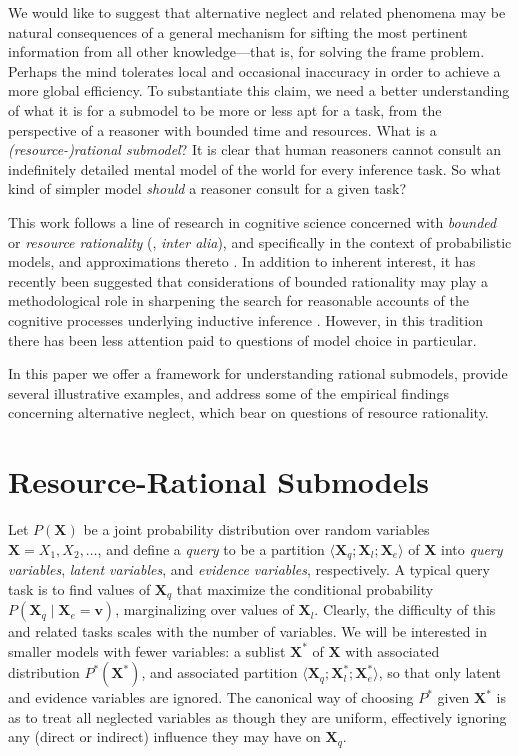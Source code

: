 \documentclass[10pt,letterpaper]{article}
\begin{document}
We would like to suggest that alternative neglect and related phenomena may be natural consequences of a general mechanism for sifting the most pertinent information from all other knowledge---that is, for solving the frame problem. Perhaps the mind tolerates local and occasional inaccuracy in order to achieve a more global efficiency. To substantiate this claim, we need a better understanding of what it is for a submodel to be more or less apt for a task, from the perspective of a reasoner with bounded time and resources. What is a \emph{(resource-)rational submodel}? It is clear that human reasoners cannot consult an indefinitely detailed mental model of the world for every inference task. So what kind of simpler model \emph{should} a reasoner consult for a given task?

This work follows a line of research in cognitive science concerned with \emph{bounded} or \emph{resource rationality} (\citealt{Simon1957,Gigerenzer1996}, \emph{inter alia}), and specifically in the context of probabilistic models, and approximations thereto \citep{Vul2014}. In addition to inherent interest, it has recently been suggested that considerations of bounded rationality may play a methodological role in sharpening the search for reasonable accounts of the cognitive processes underlying inductive inference \citep{Griffiths2014,Icard2014}. However, in this tradition there has been less attention paid to questions of model choice in particular.

In this paper we offer a framework for understanding rational submodels, provide several illustrative examples, and address some of the empirical findings concerning alternative neglect, which bear on questions of resource rationality.

\section{Resource-Rational Submodels}

Let $P(\textbf{X})$ be a joint probability distribution over random variables $\textbf{X} = X_1,X_2,\dots$, and define a \emph{query} to be a partition $\langle \textbf{X}_q;\textbf{X}_l;\textbf{X}_e\rangle$ of \textbf{X} into \emph{query variables}, \emph{latent variables}, and \emph{evidence variables}, respectively. A typical query task is to find values of $\textbf{X}_q$ that maximize the conditional probability $P(\textbf{X}_q\mid \textbf{X}_e = \textbf{v})$, marginalizing over values of $\textbf{X}_l$. Clearly, the difficulty of this and related tasks scales with the number of variables. We will be interested in smaller models with fewer variables: a sublist $\textbf{X}^*$ of $\textbf{X}$ with associated distribution $P^*(\textbf{X}^*)$, and associated partition $\langle \textbf{X}_q;\textbf{X}_l^*;\textbf{X}_e^*\rangle$, so that only latent and evidence variables are ignored. The canonical way of choosing $P^*$ given $\textbf{X}^*$ is as to treat all neglected variables as though they are uniform, effectively ignoring any (direct or indirect) influence they may have on $\textbf{X}_q$.
\end{document}
